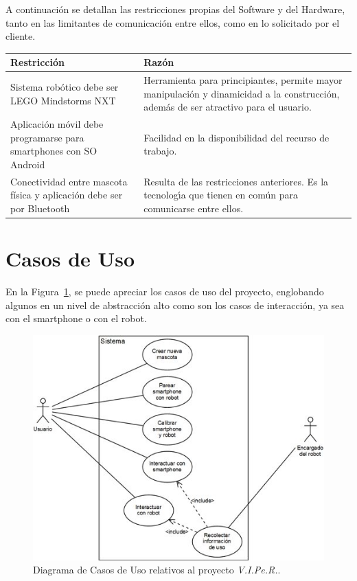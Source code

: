 \documentclass[letterpaper,12pt]{article} %
\numberwithin{equation}{section} %
\numberwithin{figure}{section} %
\numberwithin{table}{section} %
\begin{document}
A continuaci\'on se detallan las restricciones propias del Software y del Hardware, tanto en las limitantes de comunicaci\'on entre ellos, como en lo solicitado por el cliente.\\

\begin{table}[H]
  \centering
  \begin{tabular}{p{5cm}p{9cm}}\hline
    Restricci\'on & Raz\'on \\ \hline\hline %
    Sistema rob\'otico debe ser LEGO Mindstorms NXT & Herramienta para principiantes, permite mayor manipulaci\'on y dinamicidad a la construcci\'on, adem\'as de ser atractivo para el usuario.\\ \hline
    Aplicaci\'on m\'ovil debe programarse para smartphones con SO Android & Facilidad en la disponibilidad del recurso de trabajo. \\ \hline
    Conectividad entre mascota f\'isica y aplicaci\'on debe ser por Bluetooth & Resulta de las restricciones anteriores. Es la tecnolog\'{\i}a que tienen en com\'un para comunicarse entre ellos.\\ \hline \hline
  \end{tabular}
\end{table}

\newpage
\section{Casos de Uso} %

En la Figura~\ref{fig:CasoUso}, se puede apreciar los casos de uso del proyecto, englobando algunos en un nivel de abstracci\'on alto como son los casos de interacci\'on, ya sea con el smartphone o con el robot.\\

\begin{figure}[H]
   \centering
     \includegraphics[scale=1]{CasoUso.jpg}
   \caption{Diagrama de Casos de Uso relativos al proyecto \emph{V.I.Pe.R.}.}
   \label{fig:CasoUso}
\end{figure}
\end{document}
